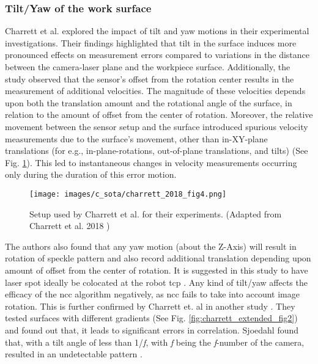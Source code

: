     \subsubsection{Tilt/Yaw of the work surface}\label{subsubsection:tilt_yaw}
    Charrett et al. \cite{charrett_2018} explored the impact of tilt and yaw motions in their experimental investigations. Their findings highlighted that tilt in the surface induces more pronounced effects on measurement errors compared to variations in the distance between the camera-laser plane and the workpiece surface. Additionally, the study observed that the sensor's offset from the rotation center results in the measurement of additional velocities. The magnitude of these velocities depends upon both the translation amount and the rotational angle of the surface, in relation to the amount of offset from the center of rotation. Moreover, the relative movement between the sensor setup and the surface introduced spurious velocity measurements due to the surface's movement, other than in-XY-plane translations (for e.g., in-plane-rotations, out-of-plane translations, and tilts) (See Fig. \ref{fig:charrett_2018_fig4}). This led to instantaneous changes in velocity measurements occurring only during the duration of this error motion.

    \begin{figure}[h]
        \centering
        \texttt{[image: images/c\_sota/charrett\_2018\_fig4.png]}
        \caption{Setup used by Charrett et al. for their experiments. (Adapted from Charrett et al. 2018 \cite{charrett_2018})}
        \label{fig:charrett_2018_fig4}
    \end{figure}

    \noindent The authors also found that any yaw motion (about the Z-Axis) will result in rotation of speckle pattern and also record additional translation depending upon amount of offset from the center of rotation. It is suggested in this study to have laser spot ideally be colocated at the robot \gls{tcp} \cite{charrett_2018}. Any kind of tilt/yaw affects the efficacy of the \gls{ncc} algorithm negatively, as \gls{ncc} fails to take into account image rotation. This is further confirmed by Charrett et. al in another study \cite{charrett_extended_theory}. They tested surfaces with different gradients (See Fig. \ref{fig:charrett_extended_fig2}) and found out that, it leads to significant errors in correlation. Sjoedahl found that, with a tilt angle of less than 1/\emph{f}, with \emph{f} being the \emph{f}-number of the camera, resulted in an undetectable pattern \cite{sjoedahl}.
    

